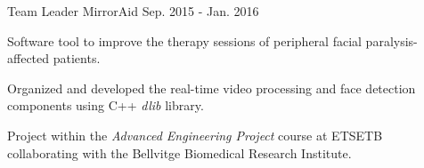 
\begin{cventries}

\cventry
  {Team Leader}
  {MirrorAid}
  {}
  {Sep. 2015 - Jan. 2016}
  {
    \begin{cvitems}
      \item {Software tool to improve the therapy sessions of peripheral facial paralysis-affected patients.}
      \item {Organized and developed the real-time video processing and face detection components using C++ \textit{dlib} library.}
      \item {Project within the \textit{Advanced Engineering Project} course at ETSETB collaborating with the Bellvitge Biomedical Research Institute.}
    \end{cvitems}
  }


\end{cventries}
